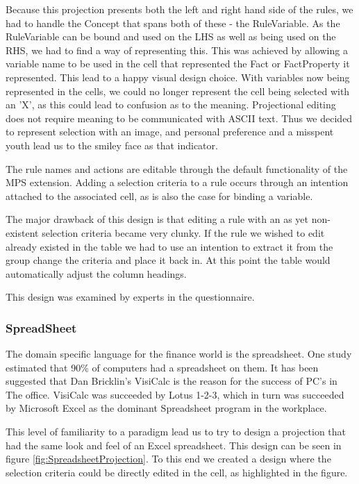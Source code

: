 Because this projection presents both the left and right hand side of the rules, we had to handle the Concept that spans both of these - the RuleVariable.
As the RuleVariable can be bound and used on the LHS as well as being used on the RHS, we had to find a way of representing this.
This was achieved by allowing a variable name to be used in the cell that represented the Fact or FactProperty it represented.
This lead to a happy visual design choice.
With variables now being represented in the cells, we could no longer represent the cell being selected with an 'X', as this could lead to confusion as to the meaning.
Projectional editing does not require meaning to be communicated with ASCII text.
Thus we decided to represent selection with an image, and personal preference and a misspent youth lead us to the smiley face as that indicator.

The rule names and actions are editable through the default functionality of the MPS extension.
Adding a selection criteria to a rule occurs through an intention attached to the associated cell, as is also the case for binding a variable.

The major drawback of this design is that editing a rule with an as yet non-existent selection criteria became very clunky.
If the rule we wished to edit already existed in the table we had to use an intention to extract it from the group change the criteria and place it back in.
At this point the table would automatically adjust the column headings.

This design was examined by experts in the questionnaire.

\subsubsection{SpreadSheet}

The domain specific language for the finance world is the spreadsheet.
One study estimated that 90\% of computers had a spreadsheet on them\cite{bradley2009using}.
It has been suggested that Dan Bricklin's VisiCalc is the reason for the success of PC's in The office.
VisiCalc was succeeded by Lotus 1-2-3, which in turn was succeeded by Microsoft Excel as the dominant Spreadsheet program in the workplace.

This level of familiarity to a paradigm lead us to try to design a projection that had the same look and feel of an Excel spreadsheet.
This design can be seen in figure \ref{fig:SpreadsheetProjection}.
To this end we created a design where the selection criteria could be directly edited in the cell, as highlighted in the figure.

